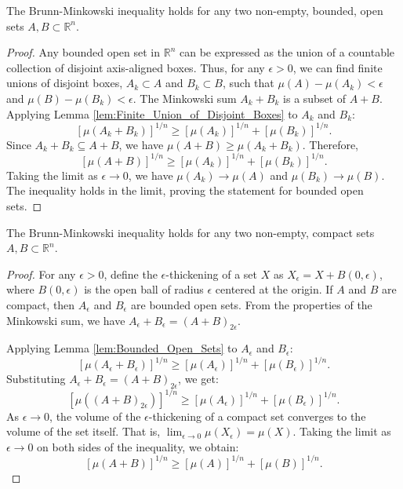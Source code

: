 \begin{lemma}
    \label{lem:Bounded_Open_Sets}
    The Brunn-Minkowski inequality holds for any two non-empty, bounded, open sets $A, B \subset \mathbb{R}^n$.
\end{lemma}

\begin{proof}
    Any bounded open set in $\mathbb{R}^n$ can be expressed as the union of a countable collection of disjoint axis-aligned boxes. Thus, for any $\epsilon > 0$, we can find finite unions of disjoint boxes, $A_k \subset A$ and $B_k \subset B$, such that $\mu(A) - \mu(A_k) < \epsilon$ and $\mu(B) - \mu(B_k) < \epsilon$.
    The Minkowski sum $A_k + B_k$ is a subset of $A+B$. Applying Lemma \ref{lem:Finite_Union_of_Disjoint_Boxes} to $A_k$ and $B_k$:
    \[ [\mu(A_k+B_k)]^{1/n} \geq [\mu(A_k)]^{1/n} + [\mu(B_k)]^{1/n}. \]
    Since $A_k+B_k \subseteq A+B$, we have $\mu(A+B) \geq \mu(A_k+B_k)$. Therefore,
    \[ [\mu(A+B)]^{1/n} \geq [\mu(A_k)]^{1/n} + [\mu(B_k)]^{1/n}. \]
    Taking the limit as $\epsilon \to 0$, we have $\mu(A_k) \to \mu(A)$ and $\mu(B_k) \to \mu(B)$. The inequality holds in the limit, proving the statement for bounded open sets.
\end{proof}

\begin{lemma}
    \label{lem:Compact_Sets}
    The Brunn-Minkowski inequality holds for any two non-empty, compact sets $A, B \subset \mathbb{R}^n$.
\end{lemma}

\begin{proof}
    For any $\epsilon > 0$, define the $\epsilon$-thickening of a set $X$ as $X_\epsilon = X + B(0, \epsilon)$, where $B(0, \epsilon)$ is the open ball of radius $\epsilon$ centered at the origin. If $A$ and $B$ are compact, then $A_\epsilon$ and $B_\epsilon$ are bounded open sets. From the properties of the Minkowski sum, we have $A_\epsilon + B_\epsilon = (A+B)_{2\epsilon}$.

    Applying Lemma \ref{lem:Bounded_Open_Sets} to $A_\epsilon$ and $B_\epsilon$:
    \[ [\mu(A_\epsilon+B_\epsilon)]^{1/n} \geq [\mu(A_\epsilon)]^{1/n} + [\mu(B_\epsilon)]^{1/n}. \]
    Substituting $A_\epsilon + B_\epsilon = (A+B)_{2\epsilon}$, we get:
    \[ [\mu((A+B)_{2\epsilon})]^{1/n} \geq [\mu(A_\epsilon)]^{1/n} + [\mu(B_\epsilon)]^{1/n}. \]
    As $\epsilon \to 0$, the volume of the $\epsilon$-thickening of a compact set converges to the volume of the set itself. That is, $\lim_{\epsilon\to 0} \mu(X_\epsilon) = \mu(X)$. Taking the limit as $\epsilon \to 0$ on both sides of the inequality, we obtain:
    \[ [\mu(A+B)]^{1/n} \geq [\mu(A)]^{1/n} + [\mu(B)]^{1/n}. \]
\end{proof}

